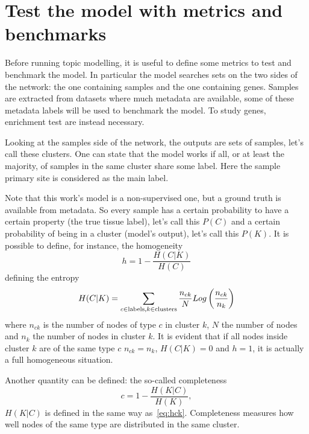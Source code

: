 \section{Test the model with metrics and benchmarks}
Before running topic modelling, it is useful to define some metrics to test and benchmark the model. In particular the model searches sets on the two sides of the network: the one containing samples and the one containing genes. Samples are extracted from datasets where much metadata are available, some of these metadata labels will be used to benchmark the model. To study genes, enrichment test are instead necessary.

Looking at the samples side of the network, the outputs are sets of samples, let's call these clusters. One can state that the model works if all, or at least the majority, of samples in the same cluster share some label. Here the sample primary site is considered as the main label.

Note that this work's model is a non-supervised one, but a ground truth is available from metadata. So every sample has a certain probability to have a certain property (the true tissue label), let's call this $P(C)$ and a certain probability of being in a cluster (model's output), let's call this $P(K)$.
It is possible to define, for instance, the homogeneity
\begin{equation}\label{eq:homogeneity}
    h=1-\frac{H(C|K)}{H(C)}
\end{equation}
defining the entropy
\begin{equation}\label{eq:hck}
    H(C|K)=\sum_{c\in \mathrm{labels},\\ k \in \mathrm{clusters}}\frac{n_{c k}}{N}Log\left(\frac{n_{c k}}{n_k}\right)
\end{equation}
where $n_{c k}$ is the number of nodes of type $c$ in cluster $k$, $N$ the number of nodes and $n_k$ the number of nodes in cluster $k$. It is evident that if all nodes inside cluster $k$ are of the same type $c$ $n_{c k}=n_{k}$, $H(C|K)=0$ and $h=1$, it is actually a full homogeneous situation.

Another quantity can be defined: the so-called completeness
\begin{equation}\label{eq:completness}
    c=1-\frac{H(K|C)}{H(K)},
\end{equation}
$H(K|C)$ is defined in the same way as~\ref{eq:hck}. Completeness measures how well nodes of the same type are distributed in the same cluster.

